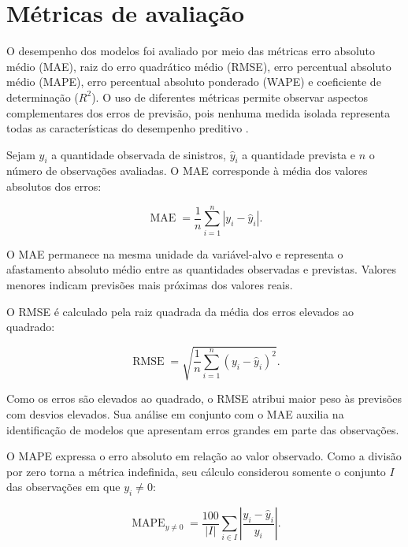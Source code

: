 \documentclass[12pt]{article}
\begin{document}
\section{Métricas de avaliação}
\label{sec:metricas}

O desempenho dos modelos foi avaliado por meio das métricas erro absoluto médio (MAE), raiz do erro quadrático médio (RMSE), erro percentual absoluto médio (MAPE), erro percentual absoluto ponderado (WAPE) e coeficiente de determinação ($R^2$). O uso de diferentes métricas permite observar aspectos complementares dos erros de previsão, pois nenhuma medida isolada representa todas as características do desempenho preditivo \cite{hyndman2006measures}.

Sejam $y_i$ a quantidade observada de sinistros, $\hat{y}_i$ a quantidade prevista e $n$ o número de observações avaliadas. O MAE corresponde à média dos valores absolutos dos erros:

\begin{equation}
    \operatorname{MAE} =
    \frac{1}{n}
    \sum_{i=1}^{n}
    \left|y_i-\hat{y}_i\right|.
    \label{eq:mae}
\end{equation}

O MAE permanece na mesma unidade da variável-alvo e representa o afastamento absoluto médio entre as quantidades observadas e previstas. Valores menores indicam previsões mais próximas dos valores reais.

O RMSE é calculado pela raiz quadrada da média dos erros elevados ao quadrado:

\begin{equation}
    \operatorname{RMSE} =
    \sqrt{
        \frac{1}{n}
        \sum_{i=1}^{n}
        \left(y_i-\hat{y}_i\right)^2
    }.
    \label{eq:rmse}
\end{equation}

Como os erros são elevados ao quadrado, o RMSE atribui maior peso às previsões com desvios elevados. Sua análise em conjunto com o MAE auxilia na identificação de modelos que apresentam erros grandes em parte das observações.

O MAPE expressa o erro absoluto em relação ao valor observado. Como a divisão por zero torna a métrica indefinida, seu cálculo considerou somente o conjunto $I$ das observações em que $y_i \neq 0$:

\begin{equation}
    \operatorname{MAPE}_{y\neq 0} =
    \frac{100}{|I|}
    \sum_{i \in I}
    \left|
        \frac{y_i-\hat{y}_i}{y_i}
    \right|.
    \label{eq:mape}
\end{equation}
\end{document}
